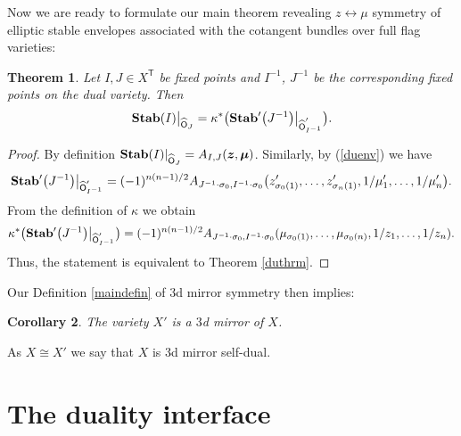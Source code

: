 \documentclass[10pt,a4paper]{amsart}
\newcommand{\bT}{\mathsf{T}}
\newcommand{\Or}{\textsf{O}}
\def\zz{{\boldsymbol z}}
\def\mub{{\boldsymbol\mu}}
\numberwithin{equation}{section}
\newtheorem{Theorem}{Theorem}[section]
\newtheorem{Corollary}[Theorem]{Corollary}
\begin{document}
Now we are ready to formulate our main theorem revealing $z\leftrightarrow \mu$ symmetry of elliptic stable envelopes associated with the cotangent bundles over full flag varieties:
 \begin{Theorem} Let $I,J \in X^{\bT}$ be fixed points and $I^{-1}$, $J^{-1}$ be the corresponding fixed points on the dual variety. Then
\begin{gather*} %
 {\bf Stab}(I)\big|_{\widehat{\Or}_{J}}=\kappa^{*}\big( {\bf Stab}'\big(J^{-1}\big)\big|_{\widehat{\Or}^{'}_{I^{-1}}}\big).
\end{gather*}
 \end{Theorem}
 \begin{proof} By definition ${\bf Stab}(I)|_{\widehat{\Or}_{J}}=A_{I,J}(\zz,\mub)$. Similarly, by (\ref{duenv}) we have
 \begin{gather*}
 {\bf Stab}'\big(J^{-1}\big)\big|_{\widehat{\Or}'_{I^{-1}}}=(-1)^{n(n-1)/2} A_{J^{-1} \cdot \sigma_{0} ,I^{-1}\cdot \sigma_{0} }\big(z_{\sigma_{0}(1)}',\dots,z_{\sigma_{n}(1)}',1/\mu'_1,\dots, 1/\mu_n'\big).
 \end{gather*}
 From the definition of $\kappa$ we obtain
 \begin{gather*}
 \kappa^{*}\big( {\bf Stab}'\big(J^{-1}\big)\big|_{\widehat{\Or}'_{I^{-1}}}\big)=
 (-1)^{n(n-1)/2} A_{J^{-1}\cdot \sigma_0,I^{-1}\cdot \sigma_{0}}(\mu_{\sigma_{0}(1)},\dots,\mu_{\sigma_{0}(n)}, 1/z_1,\dots, 1/z_n).
 \end{gather*}
Thus, the statement is equivalent to Theorem \ref{duthrm}.
\end{proof}

Our Definition \ref{maindefin} of $3$d mirror symmetry then implies:

\begin{Corollary}The variety $X'$ is a $3$d mirror of $X$.
\end{Corollary}
As $X\cong X'$ we say that $X$ is 3d mirror self-dual.

\section{The duality interface}
\end{document}
